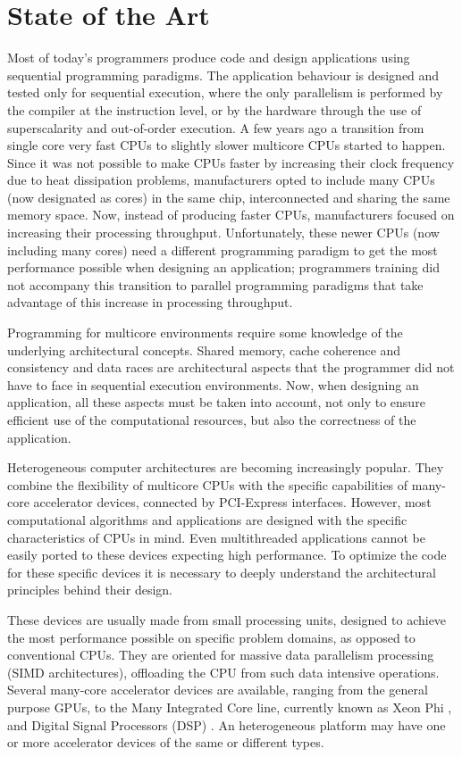 
\chapter{State of the Art}
\label{stateart}

Most of today’s programmers produce code and design applications using sequential programming paradigms. The application behaviour is designed and tested only for sequential execution, where the only parallelism is performed by the compiler at the instruction level, or by the hardware through the use of superscalarity and out-of-order execution. A few years ago a transition from single core very fast CPUs to slightly slower multicore CPUs started to happen. Since it was not possible to make CPUs faster by increasing their clock frequency due to heat dissipation problems, manufacturers opted to include many CPUs (now designated as cores) in the same chip, interconnected and sharing the same memory space. Now, instead of producing faster CPUs, manufacturers focused on increasing their processing throughput. Unfortunately, these newer CPUs (now including many cores) need a different programming paradigm to get the most performance possible when designing an application; programmers training did not accompany this transition to parallel programming paradigms that take advantage of this increase in processing throughput.

Programming for multicore environments require some knowledge of the underlying architectural concepts. Shared memory, cache coherence and consistency and data races are architectural aspects that the programmer did not have to face in sequential execution environments. Now, when designing an application, all these aspects must be taken into account, not only to ensure efficient use of the computational resources, but also the correctness of the application.

Heterogeneous computer architectures are becoming increasingly popular. They combine the flexibility of multicore CPUs with the specific capabilities of many-core accelerator devices, connected by PCI-Express interfaces. However, most computational algorithms and applications are designed with the specific characteristics of CPUs in mind. Even multithreaded applications cannot be easily ported to these devices expecting high performance. To optimize the code for these specific devices it is necessary to deeply understand the architectural principles behind their design.

These devices are usually made from small processing units, designed to achieve the most performance possible on specific problem domains, as opposed to conventional CPUs. They are oriented for massive data parallelism processing (SIMD architectures), offloading the CPU from such data intensive operations. Several many-core accelerator devices are available, ranging from the general purpose GPUs, to the \intel Many Integrated Core line, currently known as \intel Xeon Phi \cite{Intel:MIC}, and Digital Signal Processors (DSP) \cite{Texas:DSP}. An heterogeneous platform may have one or more accelerator devices of the same or different types.


